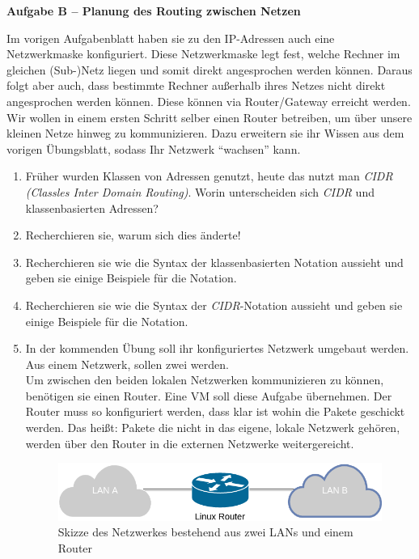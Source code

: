 \documentclass[paper=a4,fontsize=11pt]{scrartcl}%
\numberwithin{equation}{section}
\begin{document}
\begin{center}
\Large{\textbf{Aufgabe B -- Planung des Routing zwischen Netzen}}
\end{center}
\vskip0.25in
Im vorigen Aufgabenblatt haben sie zu den IP-Adressen auch eine Netzwerkmaske konfiguriert. Diese Netzwerkmaske legt fest, welche Rechner im gleichen (Sub-)Netz liegen und somit direkt angesprochen werden können. Daraus folgt aber auch, dass bestimmte Rechner außerhalb ihres Netzes nicht direkt angesprochen werden können. Diese können via Router/Gateway erreicht werden.\\
Wir wollen in einem ersten Schritt selber einen Router betreiben, um über unsere kleinen Netze hinweg zu kommunizieren. Dazu erweitern sie ihr Wissen aus dem vorigen Übungsblatt, sodass Ihr Netzwerk \enquote{wachsen} kann.
\begin{enumerate}
	\item Früher wurden Klassen von Adressen genutzt, heute das nutzt man \emph{CIDR (Classles Inter Domain Routing)}. Worin unterscheiden sich \emph{CIDR} und klassenbasierten Adressen?
	\item Recherchieren sie, warum sich dies änderte!
	\item Recherchieren sie wie die Syntax der klassenbasierten Notation aussieht und geben sie einige Beispiele für die Notation.
	\item Recherchieren sie wie die Syntax der \emph{CIDR}-Notation aussieht und geben sie einige Beispiele für die Notation.
	\item In der kommenden Übung soll ihr konfiguriertes Netzwerk umgebaut werden. Aus einem Netzwerk, sollen zwei werden.\\
	Um zwischen den beiden lokalen Netzwerken kommunizieren zu können, benötigen sie einen Router. Eine VM soll diese Aufgabe übernehmen. Der Router muss so konfiguriert werden, dass klar ist wohin die Pakete geschickt werden. Das heißt: Pakete die nicht in das eigene, lokale Netzwerk gehören, werden über den Router in die externen Netzwerke weitergereicht.
	\begin{figure}[h]
	\centering
	\includegraphics[scale=0.35]{lan}
	\caption{Skizze des Netzwerkes bestehend aus zwei LANs und einem Router}
	\end{figure}

\end{enumerate}
\end{document}
